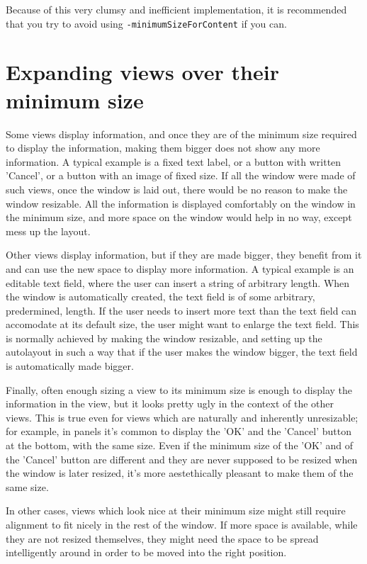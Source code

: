 Because of this very clumsy and inefficient implementation, it is
recommended that you try to avoid using
\texttt{-minimumSizeForContent} if you can.

\section{Expanding views over their minimum size}

Some views display information, and once they are of the minimum size
required to display the information, making them bigger does not show
any more information.  A typical example is a fixed text label, or a
button with written 'Cancel', or a button with an image of fixed size.
If all the window were made of such views, once the window is laid
out, there would be no reason to make the window resizable.  All the
information is displayed comfortably on the window in the minimum
size, and more space on the window would help in no way, except mess
up the layout.

Other views display information, but if they are made bigger, they
benefit from it and can use the new space to display more information.
A typical example is an editable text field, where the user can insert
a string of arbitrary length.  When the window is automatically
created, the text field is of some arbitrary, predermined, length.  If
the user needs to insert more text than the text field can accomodate
at its default size, the user might want to enlarge the text field.
This is normally achieved by making the window resizable, and setting
up the autolayout in such a way that if the user makes the window
bigger, the text field is automatically made bigger.

Finally, often enough sizing a view to its minimum size is enough to
display the information in the view, but it looks pretty ugly in the
context of the other views.  This is true even for views which are
naturally and inherently unresizable; for example, in panels it's
common to display the 'OK' and the 'Cancel' button at the bottom, with
the same size.  Even if the minimum size of the 'OK' and of the
'Cancel' button are different and they are never supposed to be
resized when the window is later resized, it's more aestethically
pleasant to make them of the same size.

In other cases, views which look nice at their minimum size might
still require alignment to fit nicely in the rest of the window.  If
more space is available, while they are not resized themselves, they
might need the space to be spread intelligently around in order to be
moved into the right position.

